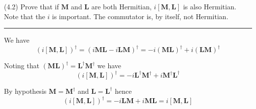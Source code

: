 \documentclass[12pt]{article}
\begin{document}
(4.2)
Prove that if $\mathbf M$ and $\mathbf L$ are both Hermitian,
$i[\mathbf M,\mathbf L]$ is also Hermitian.
Note that the $i$ is important.
The commutator is, by itself, not Hermitian.

\bigskip
\hrule

\bigskip
We have
\begin{equation*}
(i[\mathbf M,\mathbf L])^\dag=(i\mathbf M\mathbf L-i\mathbf L\mathbf M)^\dag
=-i(\mathbf M\mathbf L)^\dag+i(\mathbf L\mathbf M)^\dag
\end{equation*}

Noting that $(\mathbf M\mathbf L)^\dag=\mathbf L^\dag\mathbf M^\dag$ we have
\begin{equation*}
(i[\mathbf M,\mathbf L])^\dag
=-i\mathbf L^\dag\mathbf M^\dag+i\mathbf M^\dag\mathbf L^\dag
\end{equation*}

By hypothesis $\mathbf M=\mathbf M^\dag$ and $\mathbf L=\mathbf L^\dag$ hence
\begin{equation*}
(i[\mathbf M,\mathbf L])^\dag
=-i\mathbf L\mathbf M+i\mathbf M\mathbf L=i[\mathbf M,\mathbf L]
\end{equation*}
\end{document}
